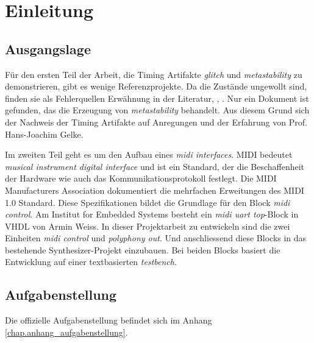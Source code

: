 
\chapter{Einleitung}\label{chap.einleitung}


\section{Ausgangslage}\label{sect.einleitung_ausgangslage}
Für den ersten Teil der Arbeit, die Timing Artifakte  \textit{glitch} und \textit{metastability} zu demonstrieren, gibt es wenige Referenzprojekte. Da die Zustände ungewollt sind, finden sie als Fehlerquellen Erwähnung in der Literatur\cite{ReferenceManual},  \cite{F_glitches}, \cite{F_metastability}. Nur ein Dokument ist gefunden, das die Erzeugung von \textit{ metastability} behandelt\cite{Metastabil}. Aus diesem Grund sich der Nachweis der Timing Artifakte auf Anregungen und der Erfahrung von Prof. Hans-Joachim Gelke.


Im zweiten Teil geht es um den Aufbau eines \textit{midi interfaces}. MIDI bedeutet \textit{musical instrument digital interface} und ist ein Standard, der die Beschaffenheit der Hardware wie auch das Kommunikationsprotokoll festlegt\cite{Midi_Braut}. Die MIDI Manufacturers Association dokumentiert die mehrfachen Erweitungen des MIDI 1.0 Standard\cite{Midi_specification}. Diese Spezifikationen bildet die Grundlage für den Block \textit{midi control}. Am Institut for Embedded Systems besteht ein \textit{midi uart top}-Block in VHDL von Armin Weiss. In dieser Projektarbeit zu entwickeln sind die zwei Einheiten \textit{midi control}  und \textit{polyphony out}. Und anschliessend diese Blocks in das bestehende Synthesizer-Projekt einzubauen. Bei beiden Blocks basiert die Entwicklung auf einer textbasierten \textit{testbench}.



\section{Aufgabenstellung}\label{sect.einleitung_ziele}
Die offizielle Aufgabenstellung befindet sich im Anhang \ref{chap.anhang_aufgabenstellung}. 
 
